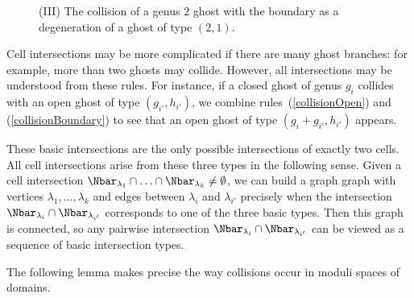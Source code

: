 \begin{figure}[ht]
\caption{(III) The collision of a genus $2$ ghost with the boundary as a degeneration of a ghost of type $(2,1)$.}
\label{collBdryPic}
\end{figure}

Cell intersections may be more complicated if there are many ghost branches: for example, more than two ghosts may collide. However, all intersections may be understood from these rules. For instance, if a closed ghost of genus $g_i$ collides with an open ghost of type $(g_{i'},h_{i'})$, we combine rules~(\ref{collisionOpen}) and (\ref{collisionBoundary}) to see that an open ghost of type $(g_i+g_{i'},h_{i'})$ appears.

\begin{remark} \label{basicInt}
These basic intersections are the only possible intersections of exactly two cells. All cell intersections arise from these three types in the following sense. Given a cell intersection $\Nbar_{\lambda_1} \cap \ldots \cap \Nbar_{\lambda_k} \neq \emptyset$, we can build a graph graph with vertices $\lambda_1,\ldots,\lambda_k$ and edges between $\lambda_i$ and $\lambda_{i'}$ precisely when the intersection $\Nbar_{\lambda_i} \cap \Nbar_{\lambda_{i'}}$ corresponds to one of the three basic types. Then this graph is connected, so any pairwise intersection $\Nbar_{\lambda_i} \cap \Nbar_{\lambda_{i'}}$ can be viewed as a sequence of basic intersection types.
\end{remark}

The following lemma makes precise the way collisions occur in moduli spaces of domains.

